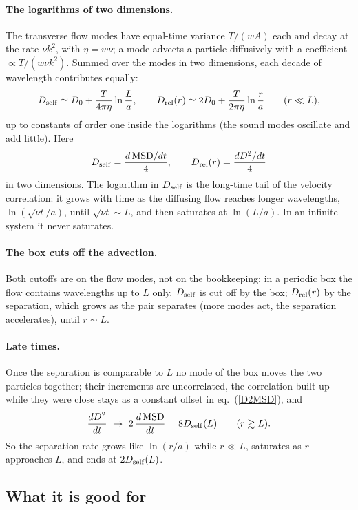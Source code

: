 \documentclass[11pt,aps,preprint,nofootinbib,superscriptaddress,tightenlines]{revtex4-2}
\def\st{\begin{equation}}
\def\stp{\end{equation}}
\def\Eq#1{eq.~(\ref{#1})}
\let\oldparagraph\paragraph
\renewcommand{\paragraph}{\par\bigskip\oldparagraph}
\begin{document}
\paragraph{The logarithms of two dimensions.}  The transverse flow modes have equal-time variance $T/(wA)$ each and decay at the
rate $\nu k^2$, with $\eta=w\nu$; a mode advects a particle diffusively with a coefficient $\propto T/(w\nu k^2)$.  Summed over the modes in two
dimensions, each decade of wavelength contributes equally:
\st
D_{\rm self}\simeq D_0+\frac{T}{4\pi\eta}\ln\frac La,\qquad
D_{\rm rel}(r)\simeq2D_0+\frac{T}{2\pi\eta}\ln\frac ra\qquad(r\ll L),
\label{logs}
\stp
up to constants of order one inside the logarithms (the sound modes oscillate and add little).  Here
\st
D_{\rm self}=\frac{d\,\mathrm{MSD}/dt}{4},\qquad D_{\rm rel}(r)=\frac{dD^2/dt}{4}
\stp
in two dimensions.  The logarithm in $D_{\rm self}$ is the long-time tail of the velocity correlation: it grows with time as the
diffusing flow reaches longer wavelengths, $\ln(\sqrt{\nu t}/a)$, until $\sqrt{\nu t}\sim L$, and then saturates at $\ln(L/a)$.  In an infinite system
it never saturates.

\paragraph{The box cuts off the advection.}  Both cutoffs are on the flow modes, not on the bookkeeping: in a periodic box the
flow contains wavelengths up to $L$ only.  $D_{\rm self}$ is cut off by the box; $D_{\rm rel}(r)$ by the separation, which grows as the pair
separates (more modes act, the separation accelerates), until $r\sim L$.

\paragraph{Late times.}  Once the separation is comparable to $L$ no mode of the box moves the two particles together; their increments
are uncorrelated, the correlation built up while they were close stays as a constant offset in \Eq{D2MSD}, and
\st
\frac{dD^2}{dt}\ \to\ 2\,\frac{d\,\mathrm{MSD}}{dt}=8D_{\rm self}(L)\qquad(r\gtrsim L) .
\stp
So the separation rate grows like $\ln(r/a)$ while $r\ll L$, saturates as $r$ approaches $L$, and ends at $2D_{\rm self}(L)$.

\subsection{What it is good for}
\label{sec:use}
\end{document}
